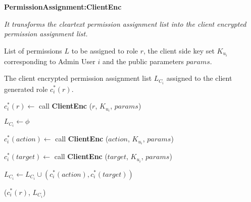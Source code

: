 \documentclass[epsfig,a4paper,11pt,titlepage]{book}
\numberwithin{algorithm}{chapter}
\newcommand{\algofontsize}{\fontsize{11}{12}\selectfont}
\begin{document}
\begin{algorithm} [htp]
{\algofontsize
\caption{\textbf{PermissionAssignment:ClientEnc}}

\label{algo:erbac-deploy-permission-assignment-client-side}

\begin{algorithmic}[1]

\INPUT \emph{It transforms the cleartext permission assignment list into the client encrypted permission assignment list.}

\Require List of permissions $L$ to be assigned to role $r$, the client side key set $K_{u_i}$ corresponding to Admin User $i$ and the public parameters $params$.

\Ensure The client encrypted permission assignment list $L_{C_i}$ assigned to the client generated role $c^*_i (r)$.

\medskip

\State $c^*_i (r) \leftarrow$ call \textbf{ClientEnc} ($r$, $K_{u_i}$, $params$) \label{line:erbac-deploy-pa-cs-role}

\State $L_{C_i} \leftarrow \phi$ \label{line:erbac-deploy-pa-cs-init}

 \label{line:erbac-deploy-pa-cs-loop}

	\State $c^*_i (action) \leftarrow$ call \textbf{ClientEnc} ($action$, $K_{u_i}$, $params$) \label{line:erbac-deploy-pa-cs-action}
	
	\State $c^*_i (target) \leftarrow$ call \textbf{ClientEnc} ($target$, $K_{u_i}$, $params$) \label{line:erbac-deploy-pa-cs-target}
	
	\State $L_{C_i} \leftarrow L_{C_i} \cup (c^*_i (action), c^*_i (target))$ \label{line:erbac-deploy-pa-cs-update}

\EndFor

\Return ($c^*_i (r)$, $L_{C_i}$)

\end{algorithmic}
}
\end{algorithm}
\end{document}
